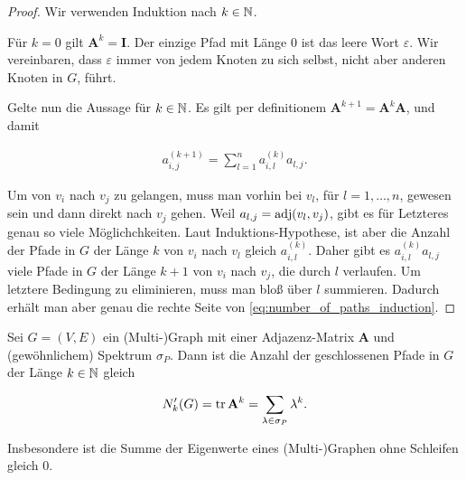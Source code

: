         \begin{proof}

            Wir verwenden Induktion nach $k \in \mathbb N$.

            Für $k = 0$ gilt $\mathbf A^k = \mathbf I$.
            Der einzige Pfad mit Länge $0$ ist das leere Wort $\varepsilon$.
            Wir vereinbaren, dass $\varepsilon$ immer von jedem Knoten zu sich selbst, nicht aber anderen Knoten in $G$, führt.

            Gelte nun die Aussage für $k \in \mathbb N$.
            Es gilt per definitionem $\mathbf A^{k+1} = \mathbf A^k \mathbf A$, und damit

            \begin{align} \label{eq:number_of_paths_induction}
                a_{i,j}^{(k+1)}
                =
                \sum_{l=1}^n
                    a_{i,l}^{(k)}
                    a_{l,j}.
            \end{align}

            Um von $v_i$ nach $v_j$ zu gelangen, muss man vorhin bei $v_l$, für $l = 1, \dots, n$, gewesen sein und dann direkt nach $v_j$ gehen.
            Weil $a_{l, j} = \operatorname{adj}(v_l, v_j)$, gibt es für Letzteres genau so viele Möglichchkeiten.
            Laut Induktions-Hypothese, ist aber die Anzahl der Pfade in $G$ der Länge $k$ von $v_i$ nach $v_l$ gleich $a_{i,l}^{(k)}$.
            Daher gibt es $a_{i,l}^{(k)} a_{l,j}$ viele Pfade in $G$ der Länge $k+1$ von $v_i$ nach $v_j$, die durch $l$ verlaufen.
            Um letztere Bedingung zu eliminieren, muss man bloß über $l$ summieren.
            Dadurch erhält man aber genau die rechte Seite von \ref{eq:number_of_paths_induction}.

        \end{proof}

        \begin{corollary} \label{cor:number_of_paths_closed}

            Sei $G = (V, E)$ ein (Multi-)Graph mit einer Adjazenz-Matrix $\mathbf A$ und (gewöhnlichem) Spektrum $\sigma_P$.
            Dann ist die Anzahl der geschlossenen Pfade in $G$ der Länge $k \in \mathbb N$ gleich

            \begin{align*}
                N_k^\prime(G)
                =
                \operatorname{tr} \mathbf A^k
                =
                \sum_{\lambda \in \sigma_P} \lambda^k.
            \end{align*}

            Insbesondere ist die Summe der Eigenwerte eines (Multi-)Graphen ohne Schleifen gleich $0$.

        \end{corollary}

